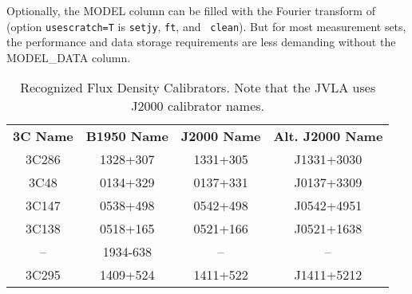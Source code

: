 Optionally, the MODEL column can be filled with the Fourier transform
of (option {\tt usescratch=T} is {\tt setjy}, {\tt ft}, and {\tt
  clean}). But for most measurement sets, the performance and data
storage requirements are less demanding without the MODEL\_DATA column.


\vspace{5mm}
\begin{table}[h!]
\caption{Recognized Flux Density Calibrators. Note that the JVLA uses
J2000 calibrator names.
        {\label{table:fluxcal-table}}}
\begin{center}
\begin{tabular}{|cccc|} \hline
{\bf 3C Name}  & {\bf B1950 Name}& {\bf J2000 Name} & {\bf Alt. J2000 Name} \\
  3C286        &  1328+307       &  1331+305       & J1331+3030\\
  3C48         &  0134+329       &  0137+331       & J0137+3309\\
  3C147        &  0538+498       &  0542+498       & J0542+4951\\
  3C138        &  0518+165       &  0521+166       & J0521+1638\\
  --           &  1934-638       &    --           & -- \\
  3C295        &  1409+524       &  1411+522       & J1411+5212\\
\hline
\end{tabular}
\end{center}
\end{table}


